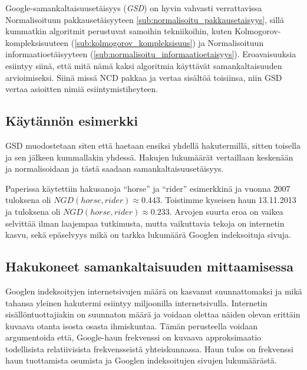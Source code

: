 \documentclass[12pt,finnish]{tktltiki2}
\theoremstyle{definition}
\theoremstyle{remark}
\begin{document}
    Google-samankaltaisuusetäisyys (\emph{GSD}) on hyvin vahvasti verrattavissa Normalisoituun pakkausetäisyyteen \ref{sub:normalisoitu_pakkausetaisyys}, sillä kummatkin algoritmit perustuvat samoihin tekniikoihin, kuten Kolmogorov-kompleksisuuteen (\ref{sub:kolmogorov_kompleksisuus}) ja Normalisoituun informaatioetäisyyteen (\ref{sub:normalisoitu_informaatioetaisyys}).
    Eroavaisuuksia esiintyy siinä, että mitä nämä kaksi algoritmia käyttävät samankaltaisuuden arvioimiseksi.
    Siinä missä NCD pakkaa ja vertaa sisältöä toisiinsa, niin GSD vertaa asioitten nimiä esiintymistiheyteen. \cite{cilibrasi2007google}

    \subsection{Käytännön esimerkki} %
    \label{sub:kaytannon_esimerkki}
      GSD muodostetaan siten että haetaan ensiksi yhdellä hakutermillä, sitten toisella ja sen jälkeen kummallakin yhdessä.
      Hakujen lukumäärät vertaillaan keskenään ja normalisoidaan ja tästä saadaan samankaltaisuusetäisyys.

      Paperissa \cite{cilibrasi2007google} käytettiin hakusanoja ``horse'' ja ``rider'' esimerkkinä ja vuonna 2007 tuloksena oli $NGD(horse, rider) \approx 0.443$.
      Toistimme kyseisen haun 13.11.2013 ja tuloksena oli $NGD(horse, rider) \approx 0.233$.
      Arvojen suurta eroa on vaikea selvittää ilman laajempaa tutkimusta, mutta vaikuttavia tekoja on internetin kasvu, sekä epäselvyys mikä on tarkka lukumäärä Googlen indeksoituja sivuja.


    \subsection{Hakukoneet samankaltaisuuden mittaamisessa} %
    \label{sub:theory_of_googling_for_similarity}


    Googlen indeksoityjen internetsivujen määrä on kasvanut suunnattomaksi ja mikä tahansa yleinen hakutermi esiintyy miljoonilla internetsivulla. Internetin sisällöntuottajiakin on suunnaton määrä ja voidaan olettaa näiden olevan erittäin kuvaava otanta isosta osasta ihmiskuntaa. Tämän perusteella voidaan argumentoida että, Google-haun frekvenssi on kuvaava approksimaatio todellisista relatiivisista frekvensseistä yhteiskunnassa. Haun tulos on frekvenssi haun tuottamista osumista ja Googlen indeksoitujen sivujen lukumäärästä. \cite{cilibrasi2007google}
\end{document}
